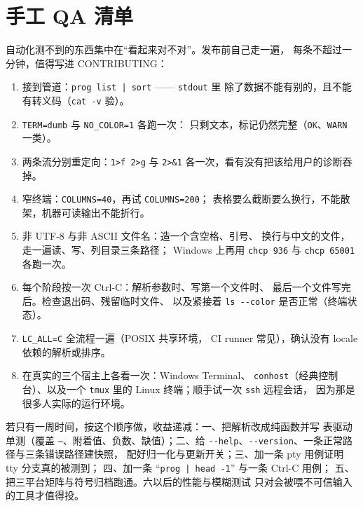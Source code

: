\documentclass[12pt,a4paper,fontset=fandol]{ctexbook}
\newcommand{\Tp}[1]{\texttt{#1}}
\newcommand{\Opt}[1]{\texttt{-\/-#1}}
\begin{document}
\section{手工 QA 清单}

自动化测不到的东西集中在``看起来对不对''。发布前自己走一遍，
每条不超过一分钟，值得写进 CONTRIBUTING：

\begin{enumerate}
\item 接到管道：\Tp{prog list | sort} —— \Tp{stdout} 里
      除了数据不能有别的，且不能有转义码（\lstinline|cat -v| 验）。
\item \lstinline|TERM=dumb| 与 \lstinline|NO_COLOR=1| 各跑一次：
      只剩文本，标记仍然完整（\Tp{OK}、\Tp{WARN} 一类）。
\item 两条流分别重定向：\lstinline|1>f 2>g| 与 \lstinline|2>&1|
      各一次，看有没有把该给用户的诊断吞掉。
\item 窄终端：\lstinline|COLUMNS=40|，再试 \lstinline|COLUMNS=200|；
      表格要么截断要么换行，不能散架，机器可读输出不能折行。
\item 非 UTF-8 与非 ASCII 文件名：造一个含空格、引号、
      换行与中文的文件，走一遍读、写、列目录三条路径；
      Windows 上再用 \lstinline|chcp 936| 与 \lstinline|chcp 65001|
      各跑一次。
\item 每个阶段按一次 Ctrl-C：解析参数时、写第一个文件时、
      最后一个文件写完后。检查退出码、残留临时文件、
      以及紧接着 \lstinline|ls --color| 是否正常（终端状态）。
\item \lstinline|LC_ALL=C| 全流程一遍（POSIX 共享环境，
      CI runner 常见），确认没有 locale 依赖的解析或排序。
\item 在真实的三个宿主上各看一次：Windows Terminal、
      \Tp{conhost}（经典控制台）、以及一个 \Tp{tmux} 里的
      Linux 终端；顺手试一次 \Tp{ssh} 远程会话，
      因为那是很多人实际的运行环境。
\end{enumerate}

\begin{guideline}[title={测试投资的优先序}]
若只有一周时间，按这个顺序做，收益递减：一、把解析改成纯函数并写
表驱动单测（覆盖 \Tp{--}、附着值、负数、缺值）；二、给
\Opt{help}、\Opt{version}、一条正常路径与三条错误路径建快照，
配好归一化与更新开关；三、加一条 pty 用例证明 tty 分支真的被测到；
四、加一条 ``\Tp{prog | head -1}'' 与一条 Ctrl-C 用例；
五、把三平台矩阵与符号归档跑通。六以后的性能与模糊测试
只对会被喂不可信输入的工具才值得投。
\end{guideline}
\end{document}
